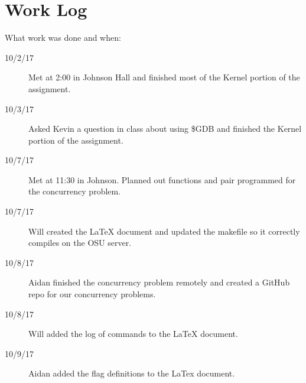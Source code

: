 \documentclass[10pt,letterpaper,draftclsnofoot,onecolumn]{IEEEtran}
\begin{document}
\section{Work Log}
\noindent What work was done and when:
\begin{description}
\item [10/2/17] Met at 2:00 in Johnson Hall and finished most of the Kernel portion of the assignment.
\item [10/3/17] Asked Kevin a question in class about using \$GDB and finished the Kernel portion of the assignment. 
\item [10/7/17] Met at 11:30 in Johnson. Planned out functions and pair programmed for the concurrency problem.
\item [10/7/17] Will created the LaTeX document and updated the makefile so it correctly compiles on the OSU server. 
\item [10/8/17] Aidan finished the concurrency problem remotely and created a GitHub repo for our concurrency problems. 
\item [10/8/17] Will added the log of commands to the LaTeX document. 
\item [10/9/17] Aidan added the flag definitions to the LaTex document. 
\end{description}
\end{document}
